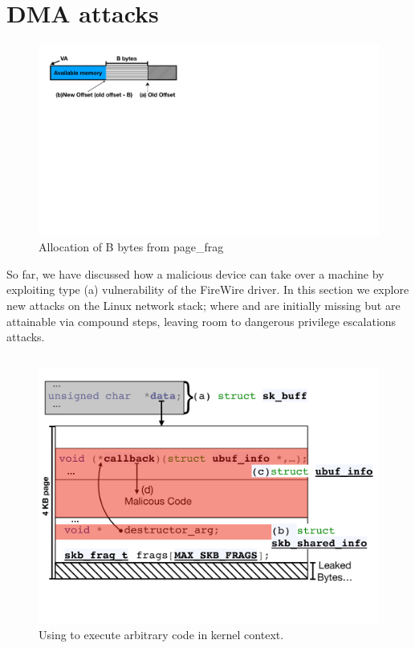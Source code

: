 \section{\Compound{} DMA attacks}\label{sec:linux_net}
\begin{figure}
    \centering
    \includegraphics[width=1\linewidth]{figs/page_frag.pdf}
    \caption{Allocation of B bytes from page\_frag}
    \label{fig:page_frags}
\end{figure}

So far, we have discussed how a malicious device can take over a machine by exploiting type (a) \subpage{} vulnerability of the FireWire driver. In this section we explore new attacks on the Linux network stack; where \means{} and \oportunity{} 
are initially missing but are attainable via compound steps, leaving room to dangerous privilege escalations attacks.

\subsection{\shinfo}
\begin{figure}[t]
    \centering
    \includegraphics[width=\linewidth]{figs/ubuf.pdf}
    \caption{Using \shinfo{} to execute arbitrary code in kernel context.}
    \label{fig:sh_info}
\end{figure}

